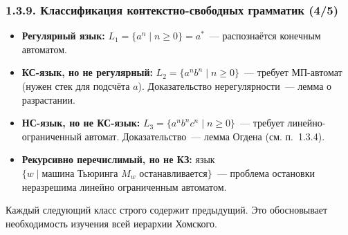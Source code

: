 \begin{frame}
\frametitle{1.3.9. Классификация контекстно-свободных грамматик (4/5)}


\begin{itemize}
\item \textbf{Регулярный язык:} $L_1 = \{a^n \mid n \ge 0\} = a^*$~--- распознаётся конечным автоматом.

\item \textbf{КС-язык, но не регулярный:} $L_2 = \{a^n b^n \mid n \ge 0\}$~--- 
требует МП-автомат (нужен стек для подсчёта $a$). 
Доказательство нерегулярности~--- лемма о разрастании.

\item \textbf{НС-язык, но не КС-язык:} $L_3 = \{a^n b^n c^n \mid n \ge 0\}$~--- 
требует линейно-ограниченный автомат. 
Доказательство~--- лемма Огдена (см. п.~1.3.4).

\item \textbf{Рекурсивно перечислимый, но не КЗ:} 
язык $\{w \mid \text{машина Тьюринга } M_w \text{ останавливается}\}$~--- 
проблема остановки неразрешима линейно ограниченным автоматом.
\end{itemize}

\begin{digress}
Каждый следующий класс строго содержит предыдущий. 
Это обосновывает необходимость изучения всей иерархии Хомского.
\end{digress}

\end{frame}



